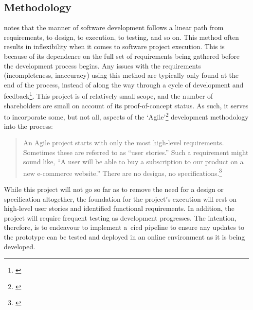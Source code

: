 \subsection{Methodology}\label{subsec:methodology}

\citet{murray-pm} notes that the  manner of software development follows a linear path from requirements, to design, to execution, to testing, and so on.
This method often results in inflexibility when it comes to software project execution.
This is because of its dependence on the full set of requirements being gathered before the development process begins.
Any issues with the requirements (incompleteness, inaccuracy) using this method are typically only found at the end of the process, instead of along the way through a cycle of development and feedback\footnote{\citep{murray-pm}}.
This project is of relatively small scope, and the number of shareholders are small on account of its proof-of-concept status.
As such, it serves to incorporate some, but not all, aspects of the `Agile'\footnote{\citep{beck2001agile}} development methodology into the process:

\begin{quotation}
    An Agile project starts with only the most high-level requirements.
    Sometimes these are referred to as “user stories.”
    Such a requirement might sound like, “A user will be able to buy a subscription to our product on a new e-commerce website.”
    There are no designs, no specifications.\footnote{\citep{murray-pm}}
\end{quotation}

While this project will not go so far as to remove the need for a design or specification altogether, the foundation for the project’s execution will rest on high-level user stories and identified functional requirements.
In addition, the project will require frequent testing as development progresses.
The intention, therefore, is to endeavour to implement a~\gls{cicd} pipeline to ensure any updates to the prototype can be tested and deployed in an online environment as it is being developed.
